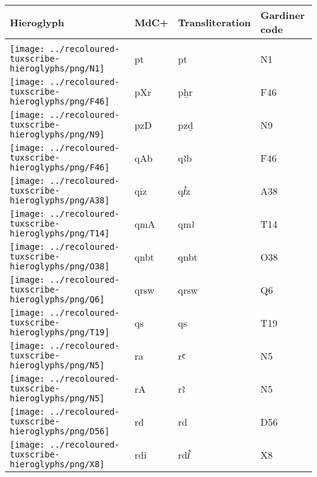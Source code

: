\begin{center}
	\begin{tabularx}{\linewidth}{YYYY}
		Hieroglyph & MdC+ & Transliteration & Gardiner code\\
		\hline\\
		\texttt{[image: ../recoloured-tuxscribe-hieroglyphs/png/N1]} & pt & pt & N1 \\ 
		\texttt{[image: ../recoloured-tuxscribe-hieroglyphs/png/F46]} & pXr & pẖr & F46 \\ 
		\texttt{[image: ../recoloured-tuxscribe-hieroglyphs/png/N9]} & pzD & pzḏ & N9 \\ 
		\texttt{[image: ../recoloured-tuxscribe-hieroglyphs/png/F46]} & qAb & qꜣb & F46 \\ 
		\texttt{[image: ../recoloured-tuxscribe-hieroglyphs/png/A38]} & qiz & qꞽz & A38 \\ 
		\texttt{[image: ../recoloured-tuxscribe-hieroglyphs/png/T14]} & qmA & qmꜣ & T14 \\ 
		\texttt{[image: ../recoloured-tuxscribe-hieroglyphs/png/O38]} & qnbt & qnbt & O38 \\ 
		\texttt{[image: ../recoloured-tuxscribe-hieroglyphs/png/Q6]} & qrsw & qrsw & Q6 \\ 
		\texttt{[image: ../recoloured-tuxscribe-hieroglyphs/png/T19]} & qs & qs & T19 \\ 
		\texttt{[image: ../recoloured-tuxscribe-hieroglyphs/png/N5]} & ra & rꜥ & N5 \\ 
		\texttt{[image: ../recoloured-tuxscribe-hieroglyphs/png/N5]} & rA & rꜣ & N5 \\ 
		\texttt{[image: ../recoloured-tuxscribe-hieroglyphs/png/D56]} & rd & rd & D56 \\ 
		\texttt{[image: ../recoloured-tuxscribe-hieroglyphs/png/X8]} & rdi & rdꞽ & X8 \\ 
	\end{tabularx}
\end{center}


